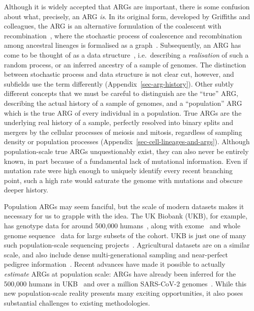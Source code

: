 \documentclass{article}
\begin{document}
Although it is widely accepted that ARGs are important, there is some
confusion about what, precisely, an ARG \emph{is}.
In its original form,
developed by Griffiths and colleagues,
the ARG is an alternative
formulation of the coalescent with recombination~\citep{hudson1983properties},
where the stochastic process of coalescence and recombination
among ancestral lineages is formalised
as a graph~\citep{griffiths1991two,
ethier1990two,griffiths1996ancestral,griffiths1997ancestral}.
Subsequently, an ARG has come to be thought of as a data
structure~\citep{minichiello2006mapping}, i.e.\ describing
a \emph{realisation} of such a random process,
or an inferred ancestry of a sample of genomes.
The distinction between stochastic process
and data structure is not clear cut, however, and subfields use the term
differently (Appendix~\ref{sec-arg-history}).
Other subtly different concepts that we must be careful to distinguish
are the ``true'' ARG, %
describing the actual history of a sample of genomes,
and a ``population'' ARG which is
the true ARG of every individual in a population.
True ARGs are the underlying real history of a sample,
perfectly resolved into binary splits and mergers by
the cellular processes of meiosis and mitosis, regardless
of sampling density or population processes
(Appendix~\ref{sec-cell-lineages-and-args}).
Although population-scale true ARGs unquestionably exist,
they can also never be entirely known, in part because of a fundamental
lack of mutational information.
Even if mutation rate were high enough to uniquely identify every
recent branching point,
such a high rate would saturate the genome with mutations
and obscure deeper history.

Population ARGs may seem fanciful, but the scale of
modern datasets makes it necessary for us to grapple with the idea.
The UK Biobank (UKB), for example, has
genotype data for around 500,000 humans~\citep{bycroft2018genome},
along with exome~\citep{backman2021exome} and
whole genome sequence~\citep{halldorsson2022sequences} data
for large subsets of the cohort.
UKB is just one of many such population-scale sequencing
projects~\citep[e.g.][]{turnbull2018hundred,
karczewski2020mutational,tanjo2021practical}.
Agricultural datasets are on a similar scale,
and also include dense multi-generational sampling
and near-perfect pedigree
information~\citep[e.g.][]{hayes20191000,Ros-Freixedes2020}.
Recent advances have made it possible to actually
\emph{estimate} ARGs at population scale:
ARGs have already been inferred for the 500,000
humans in UKB~\citep{kelleher2019inferring,zhang2023biobank}
and over a million SARS-CoV-2 genomes~\citep{zhan2023towards}.
While this new population-scale reality presents many
exciting opportunities, it also poses substantial challenges
to existing methodologies.
\end{document}
